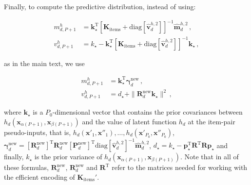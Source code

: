 \documentclass{article}
\begin{document}
Finally, to compute the predictive distribution, instead of using:

\begin{align}
m_{d,P+1}^h & = \mathbf{k}_\star^\text{T} \left[ \mathbf{K}_\text{items} +
\text{diag}[\hat{\mathbf{v}}_d^{h,2}] \right]^{-1} \hat{\mathbf{m}}_d^{h,2}\,,\label{eq:predictiveMean}\\
v_{d,P+1}^h & = k_\star - \mathbf{k}_\star^\text{T} \left[ \mathbf{K}_\text{items} +
\text{diag}[\hat{\mathbf{v}}_d^{h,2}] \right]^{-1} \mathbf{k}_\star\,,\label{eq:predictiveVariance}
\end{align}

as in the main text, we use

\begin{align}
m_{d,P+1}^h & = \mathbf{k}_\star^\text{T} \bm \gamma^\text{new}_d\,,\\
v_{d,P+1}^h & = d_\star + \parallel \mathbf{R}^\text{new}_d \mathbf{k}_\star \parallel^2\,,
\end{align}

where $\mathbf{k}_\star$ is a $P_0$-dimensional vector that contains the prior covariances
between $h_d(\mathbf{x}_{\alpha(P+1)}, \mathbf{x}_{\beta(P+1)})$
and the value of latent function $h_d$ at the item-pair pseudo-inputs, that is,
$h_d(\mathbf{x}'_{1}, \mathbf{x}''_{1}),\ldots,h_d(\mathbf{x}'_{P_0}, \mathbf{x}''_{P_0})$,
$\bm \gamma^\text{new}_d = [\mathbf{R}^\text{new}_d]^\text{T} \mathbf{R}_d^\text{new}
[\mathbf{P}_d^\text{new}]^\text{T} \text{diag}[\hat{\mathbf{v}}_d^{h,2}]^{-1}\hat{\mathbf{m}}_d^{h,2}$,
$d_\star = k_\star - \mathbf{p}_\star^\text{T} \mathbf{R}^\text{T} \mathbf{R} \mathbf{p}_\star$ and 
finally, $k_\star$ is the prior variance of $h_d(\mathbf{x}_{\alpha(P+1)}, \mathbf{x}_{\beta(P+1)})$.
Note that in all of these formulas, $\mathbf{R}_d^\text{new}$, $\mathbf{R}_d^\text{new}$ and $\mathbf{R}^\text{T}$ 
refer to the matrices needed for working with the efficient encoding of $\mathbf{K}_\text{items}'$.

{


}
\end{document}
